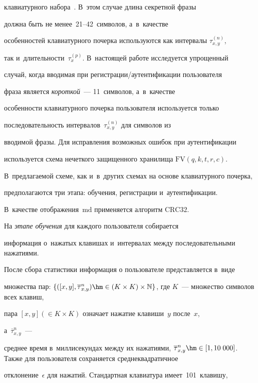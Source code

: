 клавиатурного набора~\cite{Akh2013}. В~этом случае длина секретной фразы 


должна быть не менее~21--42~символов, а~в~качестве 


особенностей клавиатурного почерка используются как интервалы $\tau^{(n)}_{x,y}$, 


так и~длительности~$\tau^{(p)}_{x}$. В~настоящей работе исследуется упрощенный 


случай, когда  вводимая при ре\-ги\-стра\-ции\!/\!аутен\-ти\-фи\-ка\-ции пользователя 


фраза является \textit{короткой}~--- 11~символов, а~в~качестве 


особенности клавиатурного почерка пользователя используется только 


последовательность интервалов~$\tau^{(n)}_{x,y}$ для символов из 


вводимой фразы. Для исправления возможных ошибок при аутентификации 


используется схема нечеткого защищенного хранилища $\mathrm{FV}(q,k,t,r,c)$. 


В~предлагаемой схеме, как и~в~других схемах на основе клавиатурного почерка, 


предполагаются три этапа: обучения, регистрации и~аутентификации. 


В~качестве отображения~$\mathrm{md}$ применяется алгоритм $\mathrm{CRC32}$.





На \textit{этапе обучения} для каждого пользователя собирается 


информация о~нажатых клавишах и~интервалах между последовательными нажатиями. 


После сбора статистики информация о пользователе представляется в~виде 


множества пар: $\{( [x,y],\overline{\tau}^{n}_{x,y} )\hm\in 


(K\times K)\times \mathbb{N}\}$, где $K$~--- множество символов всех клавиш,


 пара $[x,y](\in K\times K)$  означает нажатие клавиши~$y$ после~$x$, 


 а~$\overline{\tau}^{n}_{x,y}$~--- 


 среднее время в~миллисекундах между их нажатиями, $\overline{\tau}^{n}_{x,y}


 \hm\in[1,10\;000]$. Также для пользователя сохраняется среднеквадратичное 


 отклонение~$\epsilon$ для нажатий. Стандартная клавиатура имеет~101~клавишу, 


